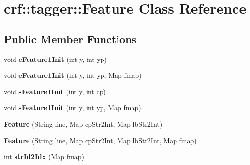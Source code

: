 \hypertarget{classcrf_1_1tagger_1_1Feature}{
\section{crf::tagger::Feature Class Reference}
\label{classcrf_1_1tagger_1_1Feature}
}
\subsection*{Public Member Functions}
\begin{DoxyCompactItemize}
\item 
\hypertarget{classcrf_1_1tagger_1_1Feature_ae87dff687324fdee61a8ff6a7fac5a99}{
void {\bfseries eFeature1Init} (int y, int yp)}
\label{classcrf_1_1tagger_1_1Feature_ae87dff687324fdee61a8ff6a7fac5a99}

\item 
\hypertarget{classcrf_1_1tagger_1_1Feature_aa0337470c1a23aae3f3456d2ea4a2274}{
void {\bfseries eFeature1Init} (int y, int yp, Map fmap)}
\label{classcrf_1_1tagger_1_1Feature_aa0337470c1a23aae3f3456d2ea4a2274}

\item 
\hypertarget{classcrf_1_1tagger_1_1Feature_a8d5ada683127a749c4a7b18db09232de}{
void {\bfseries sFeature1Init} (int y, int cp)}
\label{classcrf_1_1tagger_1_1Feature_a8d5ada683127a749c4a7b18db09232de}

\item 
\hypertarget{classcrf_1_1tagger_1_1Feature_ad63a3c9bc363c63ccdf21449799f4400}{
void {\bfseries sFeature1Init} (int y, int yp, Map fmap)}
\label{classcrf_1_1tagger_1_1Feature_ad63a3c9bc363c63ccdf21449799f4400}

\item 
\hypertarget{classcrf_1_1tagger_1_1Feature_ab6fbe9a014d45b5db359ac540d2e7864}{
{\bfseries Feature} (String line, Map cpStr2Int, Map lbStr2Int)}
\label{classcrf_1_1tagger_1_1Feature_ab6fbe9a014d45b5db359ac540d2e7864}

\item 
\hypertarget{classcrf_1_1tagger_1_1Feature_a23b1b0bdf09bca40a3340473f12ab433}{
{\bfseries Feature} (String line, Map cpStr2Int, Map lbStr2Int, Map fmap)}
\label{classcrf_1_1tagger_1_1Feature_a23b1b0bdf09bca40a3340473f12ab433}

\item 
\hypertarget{classcrf_1_1tagger_1_1Feature_ae96be026372abdcaf076f20ef12485d0}{
int {\bfseries strId2Idx} (Map fmap)}
\label{classcrf_1_1tagger_1_1Feature_ae96be026372abdcaf076f20ef12485d0}


\end{DoxyCompactItemize}
